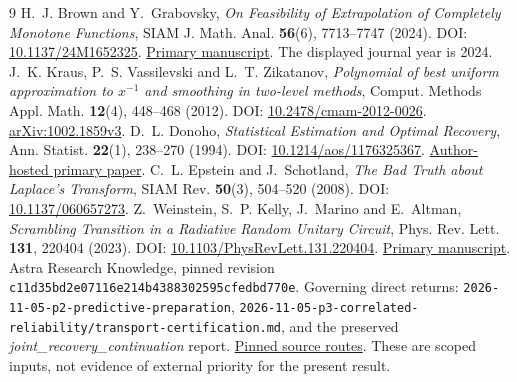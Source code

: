 \documentclass[11pt,a4paper]{article}
\begin{document}
\begin{thebibliography}{9}
 H.~J. Brown and Y.~Grabovsky, \emph{On Feasibility of Extrapolation of Completely Monotone Functions}, SIAM J. Math. Anal. \textbf{56}(6), 7713--7747 (2024). DOI: \href{https://doi.org/10.1137/24M1652325}{10.1137/24M1652325}. \href{https://arxiv.org/html/2401.15178v2}{Primary manuscript}. The displayed journal year is 2024.
 J.~K. Kraus, P.~S. Vassilevski and L.~T. Zikatanov, \emph{Polynomial of best uniform approximation to $x^{-1}$ and smoothing in two-level methods}, Comput. Methods Appl. Math. \textbf{12}(4), 448--468 (2012). DOI: \href{https://doi.org/10.2478/cmam-2012-0026}{10.2478/cmam-2012-0026}. \href{https://arxiv.org/pdf/1002.1859}{arXiv:1002.1859v3}.
 D.~L. Donoho, \emph{Statistical Estimation and Optimal Recovery}, Ann. Statist. \textbf{22}(1), 238--270 (1994). DOI: \href{https://doi.org/10.1214/aos/1176325367}{10.1214/aos/1176325367}. \href{https://web.stanford.edu/dept/statistics/cgi-bin/donoho/wp-content/uploads/2018/08/SEOR.pdf}{Author-hosted primary paper}.
 C.~L. Epstein and J.~Schotland, \emph{The Bad Truth about Laplace's Transform}, SIAM Rev. \textbf{50}(3), 504--520 (2008). DOI: \href{https://doi.org/10.1137/060657273}{10.1137/060657273}.
 Z.~Weinstein, S.~P. Kelly, J.~Marino and E.~Altman, \emph{Scrambling Transition in a Radiative Random Unitary Circuit}, Phys. Rev. Lett. \textbf{131}, 220404 (2023). DOI: \href{https://doi.org/10.1103/PhysRevLett.131.220404}{10.1103/PhysRevLett.131.220404}. \href{https://arxiv.org/html/2210.14242v2}{Primary manuscript}.
 Astra Research Knowledge, pinned revision \texttt{c11d35bd2e07116e214b4388302595cfedbd770e}. Governing direct returns: \texttt{2026-11-05-p2-predictive-preparation}, \texttt{2026-11-05-p3-correlated-reliability/transport-certification.md}, and the preserved \emph{joint\_recovery\_continuation} report. \href{https://github.com/harjassand/astra-research-knowledge/tree/c11d35bd2e07116e214b4388302595cfedbd770e/research/returns}{Pinned source routes}. These are scoped inputs, not evidence of external priority for the present result.
\end{thebibliography}
\end{document}
